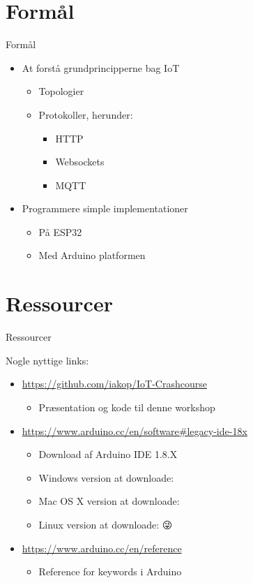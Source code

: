 \documentclass[aspectratio=169]{beamer}
\begin{document}
\section{Formål}
\begin{frame}{Formål}
	\begin{textBox}
		\begin{itemize}
			\item At forstå grundprincipperne bag IoT
			\begin{itemize}
				\item Topologier
				\item Protokoller, herunder:
				\begin{itemize}
					\item HTTP
					\item Websockets
					\item MQTT
				\end{itemize}
			\end{itemize}
			\item Programmere simple implementationer
			\begin{itemize}
				\item På ESP32
				\item Med Arduino platformen
			\end{itemize}
		\end{itemize}
	\end{textBox}
\end{frame}

\section{Ressourcer}
\begin{frame}{Ressourcer}
	\begin{textBox}
	Nogle nyttige links:
		\begin{itemize}
			\item \url{https://github.com/iakop/IoT-Crashcourse}
			\begin{itemize}
				\item Præsentation og kode til denne workshop
			\end{itemize}
			\item \url{https://www.arduino.cc/en/software\#legacy-ide-18x}
			\begin{itemize}
				\item Download af Arduino IDE 1.8.X
				\item Windows version at downloade: 
				\item Mac OS X version at downloade:  
				\item Linux version at downloade: \color{arduinoBlue}😜%
			\end{itemize}
			\item \url{https://www.arduino.cc/en/reference}
			\begin{itemize}
				\item Reference for keywords i Arduino
			\end{itemize}
		\end{itemize}
	\end{textBox}
\end{frame}
\end{document}

